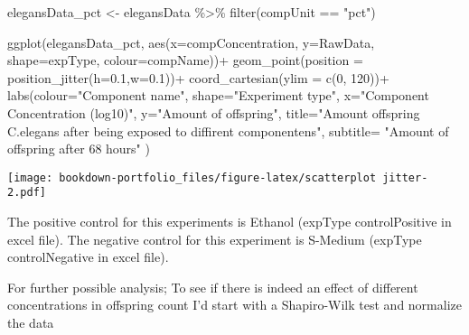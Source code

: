 \documentclass[
]{book}
\newenvironment{Shaded}{\begin{snugshade}}{\end{snugshade}}
\newcommand{\AttributeTok}[1]{\textcolor[rgb]{0.77,0.63,0.00}{#1}}
\newcommand{\DecValTok}[1]{\textcolor[rgb]{0.00,0.00,0.81}{#1}}
\newcommand{\FloatTok}[1]{\textcolor[rgb]{0.00,0.00,0.81}{#1}}
\newcommand{\FunctionTok}[1]{\textcolor[rgb]{0.00,0.00,0.00}{#1}}
\newcommand{\NormalTok}[1]{#1}
\newcommand{\OtherTok}[1]{\textcolor[rgb]{0.56,0.35,0.01}{#1}}
\newcommand{\SpecialCharTok}[1]{\textcolor[rgb]{0.00,0.00,0.00}{#1}}
\newcommand{\StringTok}[1]{\textcolor[rgb]{0.31,0.60,0.02}{#1}}
\begin{document}
\begin{Shaded}
\begin{Highlighting}[]
\NormalTok{elegansData\_pct }\OtherTok{\textless{}{-}}\NormalTok{ elegansData }\SpecialCharTok{\%\textgreater{}\%} \FunctionTok{filter}\NormalTok{(compUnit }\SpecialCharTok{==} \StringTok{"pct"}\NormalTok{)}

\FunctionTok{ggplot}\NormalTok{(elegansData\_pct, }\FunctionTok{aes}\NormalTok{(}\AttributeTok{x=}\NormalTok{compConcentration, }\AttributeTok{y=}\NormalTok{RawData, }\AttributeTok{shape=}\NormalTok{expType, }\AttributeTok{colour=}\NormalTok{compName))}\SpecialCharTok{+}
  \FunctionTok{geom\_point}\NormalTok{(}\AttributeTok{position =} \FunctionTok{position\_jitter}\NormalTok{(}\AttributeTok{h=}\FloatTok{0.1}\NormalTok{,}\AttributeTok{w=}\FloatTok{0.1}\NormalTok{))}\SpecialCharTok{+}
  \FunctionTok{coord\_cartesian}\NormalTok{(}\AttributeTok{ylim =} \FunctionTok{c}\NormalTok{(}\DecValTok{0}\NormalTok{, }\DecValTok{120}\NormalTok{))}\SpecialCharTok{+}
  \FunctionTok{labs}\NormalTok{(}\AttributeTok{colour=}\StringTok{"Component name"}\NormalTok{, }\AttributeTok{shape=}\StringTok{"Experiment type"}\NormalTok{,}
       \AttributeTok{x=}\StringTok{"Component Concentration (log10)"}\NormalTok{,}
       \AttributeTok{y=}\StringTok{"Amount of offspring"}\NormalTok{,}
       \AttributeTok{title=}\StringTok{"Amount offspring C.elegans after being exposed to diffirent componentens"}\NormalTok{,}
       \AttributeTok{subtitle=} \StringTok{"Amount of offspring after 68 hours"}
\NormalTok{)}
\end{Highlighting}
\end{Shaded}

\texttt{[image: bookdown-portfolio\_files/figure-latex/scatterplot jitter-2.pdf]}

The positive control for this experiments is Ethanol (expType controlPositive in excel file).
The negative control for this experiment is S-Medium (expType controlNegative in excel file).

For further possible analysis;
To see if there is indeed an effect of different concentrations in offspring count I'd start with a Shapiro-Wilk test and normalize the data
\end{document}
